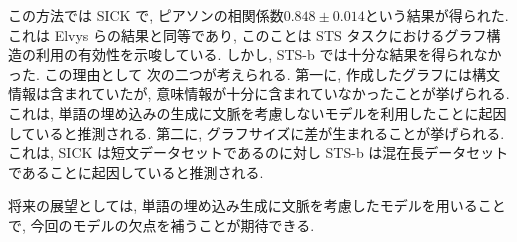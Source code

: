 \documentclass{abst}
\begin{document}
{この方法では SICK で, ピアソンの相関係数$0.848 ± 0.014$という結果が得られた.これは Elvys らの結果と同等であり, このことは STS タスクにおけるグラフ構造の利用の有効性を示唆している.
しかし, STS-b では十分な結果を得られなかった.
この理由として 次の二つが考えられる.
第一に, 作成したグラフには構文情報は含まれていたが, 意味情報が十分に含まれていなかったことが挙げられる.これは, 単語の埋め込みの生成に文脈を考慮しないモデルを利用したことに起因していると推測される.
第二に, グラフサイズに差が生まれることが挙げられる.これは, SICK は短文データセットであるのに対し STS-b は混在長データセットであることに起因していると推測される.
\par 将来の展望としては, 単語の埋め込み生成に文脈を考慮したモデルを用いることで, 今回のモデルの欠点を補うことが期待できる.
}
\end{document}
